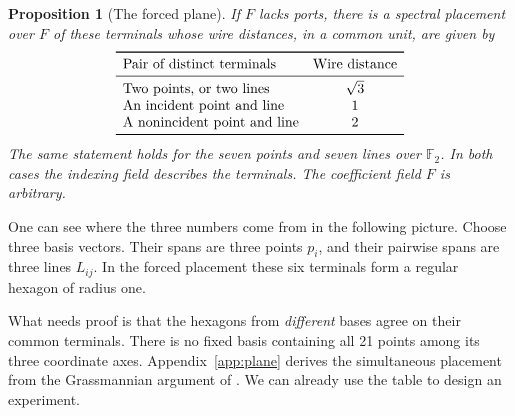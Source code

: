 \documentclass[11pt]{article}
\newtheorem{proposition}[theorem]{Proposition}
\theoremstyle{definition}
\newcommand{\F}{\mathbb F}
\begin{document}
\begin{proposition}[The forced plane]\label{prop:plane}
If \(F\) lacks ports, there is a spectral placement over \(F\) of these
terminals whose wire distances, in a common unit, are given by
\[
\begin{array}{lc}
 \toprule
 \text{Pair of distinct terminals} & \text{Wire distance}\\
 \midrule
 \text{Two points, or two lines} & \sqrt3\\
 \text{An incident point and line} & 1\\
 \text{A nonincident point and line} & 2\\
 \bottomrule
\end{array}
\]
The same statement holds for the seven points and seven lines over
\(\F_2\). In both cases the indexing field describes the terminals. The
coefficient field \(F\) is arbitrary.
\end{proposition}

One can see where the three numbers come from in the following picture.
Choose three basis vectors. Their spans are three points \(p_i\), and their
pairwise spans are three lines \(L_{ij}\). In the forced placement these
six terminals form a regular hexagon of radius one.

\begin{center}
\end{center}

What needs proof is that the hexagons from \emph{different} bases agree
on their common terminals. There is no fixed basis containing all 21
points among its three coordinate axes. Appendix~\ref{app:plane} derives
the simultaneous placement from the Grassmannian argument of
\cite{euclid}. We can already use the table to design an experiment.
\end{document}
